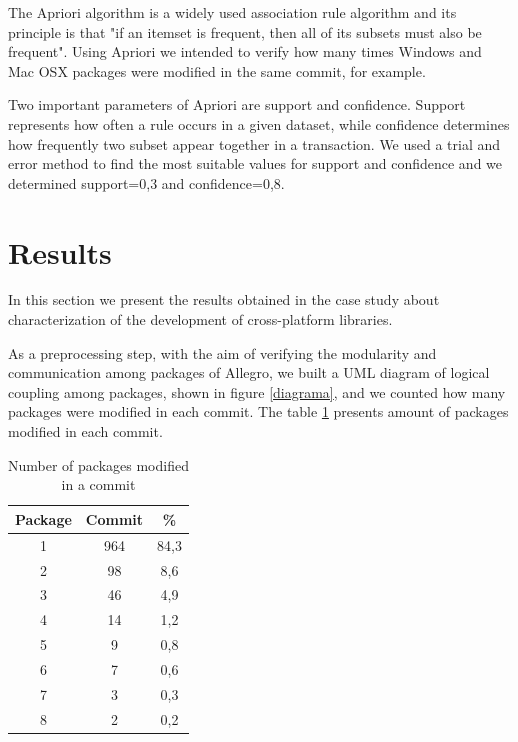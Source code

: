 \documentclass[10pt, conference]{IEEEtran}
\begin{document}
The Apriori algorithm is a widely used association rule algorithm and its principle is that "if an itemset is frequent, then all of its subsets must also be frequent".
Using Apriori we intended to verify how many times Windows and Mac OSX packages were modified in the same commit, for example. 

Two important parameters of Apriori are support and confidence. Support represents how often a rule occurs in a given dataset, while confidence determines how frequently two subset appear together in a transaction. We used a trial and error method to find the most suitable values for support and confidence and we determined support=0,3 and confidence=0,8.     



\section{Results}
In this section we present the results obtained in the case study about characterization of the development of cross-platform libraries. 

As a preprocessing step, with the aim of verifying the modularity and communication among packages of Allegro, we built a UML diagram of logical coupling among packages, shown in figure \ref{diagrama}, and we counted how many packages were modified in each commit. The table  \ref{packagegeneral} presents amount of packages modified in each commit. 

\begin{table}[h]
\renewcommand{\arraystretch}{1.3}
\caption{Number of packages modified in a commit}
\label{packagegeneral}
\centering
\begin{tabular}{|c|c|c|}
\hline
 Package & Commit & \%\\
\hline
1&		964&	84,3\\
2&		98&		8,6\\
3&		46& 	4,9\\
4&		14&		1,2\\
5&		9&		0,8\\
6&		7&		0,6\\
7&		3&		0,3\\
8&		2&		0,2\\

\hline
\end{tabular}
\end{table}
\end{document}
